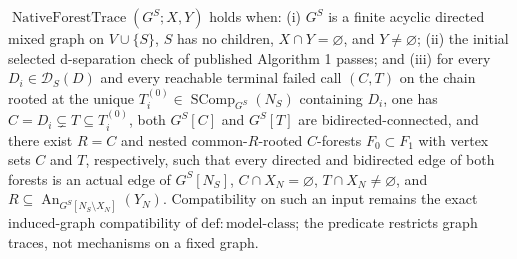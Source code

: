 \(\operatorname{NativeForestTrace}(G^S;X,Y)\) holds when: (i) \(G^S\) is a finite acyclic directed mixed graph on \(V\cup\{S\}\), \(S\) has no children, \(X\cap Y=\varnothing\), and \(Y\ne\varnothing\); (ii) the initial selected d-separation check of published Algorithm 1 passes; and (iii) for every \(D_i\in\mathcal D_S(D)\) and every reachable terminal failed call \((C,T)\) on the chain rooted at the unique \(T_i^{(0)}\in\operatorname{SComp}_{G^S}(N_S)\) containing \(D_i\), one has \(C=D_i\subsetneq T\subseteq T_i^{(0)}\), both \(G^S[C]\) and \(G^S[T]\) are bidirected-connected, and there exist \(R=C\) and nested common-\(R\)-rooted \(C\)-forests \(F_0\subset F_1\) with vertex sets \(C\) and \(T\), respectively, such that every directed and bidirected edge of both forests is an actual edge of \(G^S[N_S]\), \(C\cap X_N=\varnothing\), \(T\cap X_N\ne\varnothing\), and \(R\subseteq\operatorname{An}_{G^S[N_S\setminus X_N]}(Y_N)\). Compatibility on such an input remains the exact induced-graph compatibility of \(\mathrm{def:model\text{-}class}\); the predicate restricts graph traces, not mechanisms on a fixed graph.